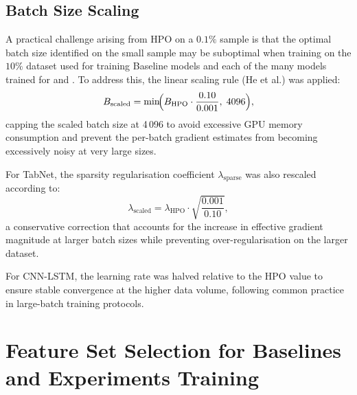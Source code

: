 \documentclass[../main.tex]{subfiles}
\begin{document}
\begin{landscape}
\begin{table}[htbp]
{\begin{tabular}{lrrrrrrr rrr rrr}
    \bottomrule
  \end{tabular}%
  }
\end{table}
\end{landscape}


\newpage
\subsection{Batch Size Scaling}
\label{sec:batch-scaling}

A practical challenge arising from HPO on a $0.1\%$ sample is that the optimal batch size identified on the small sample may be suboptimal when training on the $10\%$ dataset used for training Baseline models and each of the many models trained for  and . To address this, the linear scaling rule (He et al.) was applied:
\[
    B_{\text{scaled}} = \min\!\Bigl( B_{\text{HPO}} \cdot \frac{0.10}{0.001},\; 4096 \Bigr),
\]
capping the scaled batch size at 4\,096 to avoid excessive GPU memory consumption and prevent the per-batch gradient estimates from becoming excessively noisy at very large sizes.

For TabNet, the sparsity regularisation coefficient $\lambda_{\text{sparse}}$ was also rescaled according to:
\[
    \lambda_{\text{scaled}} = \lambda_{\text{HPO}} \cdot \sqrt{\frac{0.001}{0.10}},
\]
a conservative correction that accounts for the increase in effective gradient magnitude at larger batch sizes while preventing over-regularisation on the larger dataset.

For CNN-LSTM, the learning rate was halved relative to the HPO value to ensure stable convergence at the higher data volume, following common practice in large-batch training protocols.

\newpage
\section{Feature Set Selection for Baselines and Experiments Training}
\label{sec:feature-selection}
\end{document}
